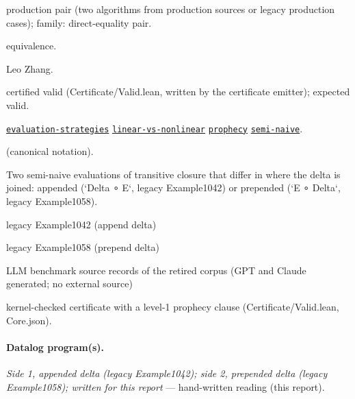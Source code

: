 \documentclass[10pt]{article}
\begin{document}
\begin{description}[leftmargin=2.6cm,style=nextline,itemsep=1pt]

\item[Category] production pair (two algorithms from production sources or legacy production cases); family: direct-equality pair.

\item[Kind] equivalence.

\item[Contributors] Leo Zhang.

\item[Status] certified valid (Certificate/Valid.lean, written by the certificate emitter); expected valid.

\item[Tags] \hyperref[tag:evaluation-strategies]{\texttt{evaluation-strategies}} \hyperref[tag:linear-vs-nonlinear]{\texttt{linear-vs-nonlinear}} \hyperref[tag:prophecy]{\texttt{prophecy}} \hyperref[tag:semi-naive]{\texttt{semi-naive}}.

\item[Input]  (canonical notation).

\item[Summary] Two semi-naive evaluations of transitive closure that differ in where the delta is joined: appended (`Delta ∘ E`, legacy Example1042) or prepended (`E ∘ Delta`, legacy Example1058).

\item[Sides] legacy Example1042 (append delta) \par legacy Example1058 (prepend delta)

\item[Sources] {\raggedright LLM benchmark source records of the retired corpus (GPT and Claude generated; no external source)\par}

\item[Prophecy] kernel-checked certificate with a level-1 prophecy clause (Certificate/Valid.lean, Core.json).

\end{description}

\paragraph{Datalog program(s).}

{\raggedright\textit{Side 1, appended delta (legacy Example1042); side 2, prepended delta (legacy Example1058); written for this report} --- hand-written reading (this report).\par}
\end{document}
